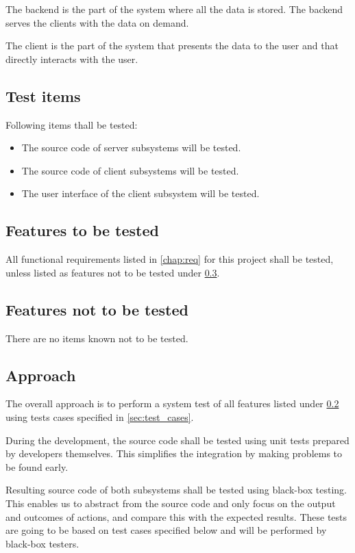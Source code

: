 \documentclass[11pt]{book}
\begin{document}
The backend is the part of the system where all the data is stored. The backend serves the clients with the data on demand.

The client is the part of the system that presents the data to the user and that directly interacts with the user.

\subsection{Test items}
Following items thall be tested:

\begin{itemize}
	\item The source code of server subsystems will be tested.
	\item The source code of client subsystems will be tested.
	\item The user interface of the client subsystem will be tested.
\end{itemize}

\subsection{Features to be tested} \label{sec:test_plan_features_tested}
All functional requirements listed in \ref{chap:req} for this project shall be tested, unless listed as features not to be tested under \ref{sec:test_plan_features_not_tested}.

\subsection{Features not to be tested} \label{sec:test_plan_features_not_tested}
There are no items known not to be tested.

\subsection{Approach}
The overall approach is to perform a system test of all features listed under \ref{sec:test_plan_features_tested} using tests cases specified in \ref{sec:test_cases}.

During the development, the source code shall be tested using unit tests prepared by developers themselves. This simplifies the integration by making problems to be found early.

Resulting source code of both subsystems shall be tested using black-box testing. This enables us to abstract from the source code and only focus on the output and outcomes of actions, and compare this with the expected results. These tests are going to be based on test cases specified below and will be performed by black-box testers.
\end{document}
